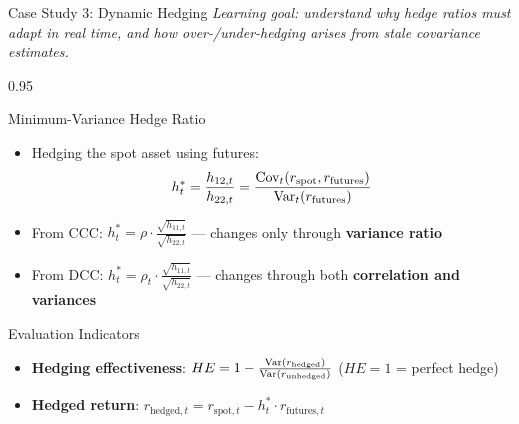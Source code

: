 \documentclass[9pt, aspectratio=169, t]{beamer}
\begin{document}
\begin{frame}{Case Study 3: Dynamic Hedging}
    \vspace{-2mm}
    {\scriptsize\textit{Learning goal: understand why hedge ratios must adapt in real time, and how over-/under-hedging arises from stale covariance estimates.}}\vspace{1mm}
    \begin{cminipage}{0.95\textwidth}
    {\footnotesize
    \begin{block}{Minimum-Variance Hedge Ratio}
        \begin{itemize}\setlength{\itemsep}{0pt}
            \item Hedging the spot asset using futures:
            \[
                h_t^* = \frac{h_{12,t}}{h_{22,t}} = \frac{\text{Cov}_t(r_{\text{spot}}, r_{\text{futures}})}{\text{Var}_t(r_{\text{futures}})}
            \]
            \item From CCC: $h_t^* = \rho \cdot \frac{\sqrt{h_{11,t}}}{\sqrt{h_{22,t}}}$ --- changes only through \textbf{variance ratio}
            \item From DCC: $h_t^* = \rho_t \cdot \frac{\sqrt{h_{11,t}}}{\sqrt{h_{22,t}}}$ --- changes through both \textbf{correlation and variances}
        \end{itemize}
    \end{block}
    \begin{block}{Evaluation Indicators}
        \begin{itemize}\setlength{\itemsep}{0pt}
            \item \textbf{Hedging effectiveness}: $HE = 1 - \frac{\text{Var}(r_{\text{hedged}})}{\text{Var}(r_{\text{unhedged}})}$ \quad ($HE = 1$ = perfect hedge)
            \item \textbf{Hedged return}: $r_{\text{hedged},t} = r_{\text{spot},t} - h_t^* \cdot r_{\text{futures},t}$
        \end{itemize}
    \end{block}
    }
    \end{cminipage}
\end{frame}
\end{document}
